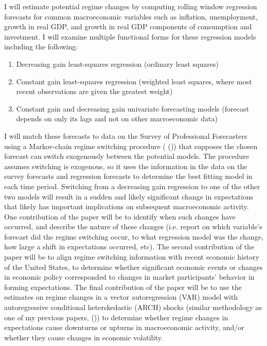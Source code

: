 \documentclass[12pt]{article}
\newcommand{\be}{\begin{enumerate}\setlength{\leftmargin}{0pt}}
\newcommand{\ee}{\end{enumerate}}
\newcommand{\citee}[1]{\citename{#1} (\citeyear{#1})}
\begin{document}
I will estimate potential regime changes by computing rolling window regression forecasts for common macroeconomic variables such as  inflation, unemployment, growth in real GDP, and growth in real GDP components of consumption and investment.  I will examine multiple functional forms for these regression models including the following:
\be
\item Decreasing gain least-squares regression (ordinary least squares)
\item Constant gain least-squares regression (weighted least squares, where most recent observations are given the greatest weight)
\item Constant gain and decreasing gain univariate forecasting models (forecast depends on only its lags and not on other macroeconomic data)
\ee
I will match these forecasts to data on the Survey of Professional Forecasters using a Markov-chain regime switching procedure (\citee{kim1994}) that supposes the chosen forecast can switch exogenously between the potential models.  The procedure assumes switching is exogenous, so it uses the information in the data on the survey forecasts and regression forecasts to determine the best fitting model in each time period.  Switching from a decreasing gain regression to one of the other two models will result in a sudden and likely significant change in expectations that likely has important implications on subsequent macroeconomic activity.  One contribution of the paper will be to identify when such changes have occurred, and describe the nature of these changes (i.e. report on which variable's forecast did the regime switching occur, to what regression model was the change, how large a shift in expectations occurred, etc).  The second contribution of the paper will be to align regime switching information with recent economic history of the United States, to determine whether significant economic events or changes in economic policy corresponded to changes in market participants' behavior in forming expectations.  The final contribution of the paper will be to use the estimates on regime changes in a vector autoregression (VAR) model with autoregressive conditional heterskedastic (ARCH) shocks (similar methodology as one of my previous papers, \citee{herro_murray}) to determine whether regime changes in expectations cause downturns or upturns in macroeconomic activity, and/or whether they cause changes in economic volatility.
\end{document}
